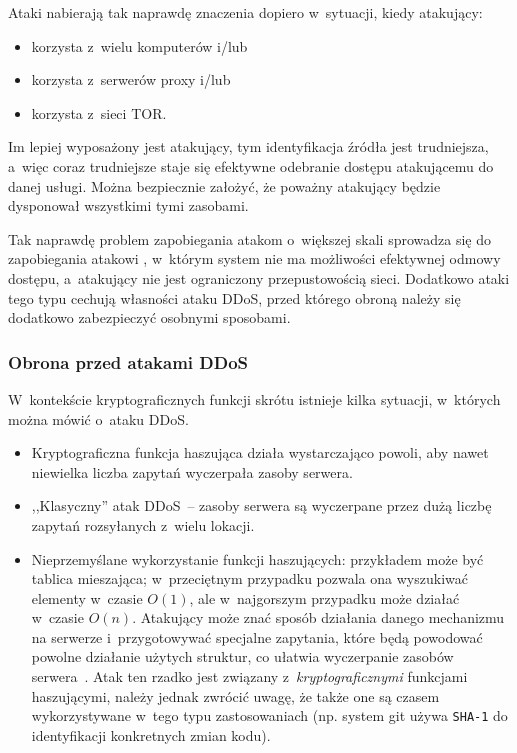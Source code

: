 Ataki  nabierają tak naprawdę znaczenia dopiero w~sytuacji, kiedy
atakujący:

\begin{itemize}

\item korzysta z~wielu komputerów i/lub
\item korzysta z~serwerów proxy i/lub
\item korzysta z~sieci TOR.

\end{itemize}

Im lepiej wyposażony jest atakujący, tym identyfikacja źródła jest trudniejsza,
a~więc coraz trudniejsze staje się efektywne odebranie dostępu atakującemu
do danej usługi. Można bezpiecznie założyć, że poważny atakujący będzie
dysponował wszystkimi tymi zasobami.

Tak naprawdę problem zapobiegania atakom o~większej skali sprowadza się do
zapobiegania atakowi , w~którym system nie ma możliwości efektywnej
odmowy dostępu, a~atakujący nie jest ograniczony przepustowością sieci.
Dodatkowo ataki tego typu cechują własności ataku DDoS, przed którego obroną
należy się dodatkowo zabezpieczyć osobnymi sposobami.

\subsubsection{Obrona przed atakami DDoS}
W~kontekście kryptograficznych funkcji skrótu istnieje kilka sytuacji,
w~których można mówić o~ataku DDoS.

\begin{itemize}

\item Kryptograficzna funkcja haszująca działa wystarczająco powoli, aby nawet
niewielka liczba zapytań wyczerpała zasoby serwera.

\item ,,Klasyczny'' atak DDoS~-- zasoby serwera są wyczerpane przez dużą liczbę
zapytań rozsyłanych z~wielu lokacji.

\item Nieprzemyślane wykorzystanie funkcji haszujących: przykładem może być
tablica mieszająca; w~przeciętnym przypadku pozwala ona wyszukiwać elementy
w~czasie $O(1)$, ale w~najgorszym przypadku może działać w~czasie $O(n)$.
Atakujący może znać sposób działania danego mechanizmu na serwerze
i~przygotowywać specjalne zapytania, które będą powodować powolne działanie
użytych struktur, co ułatwia wyczerpanie zasobów serwera~\cite{ddos_hashes}.
Atak ten rzadko jest związany z~\emph{kryptograficznymi} funkcjami haszującymi,
należy jednak zwrócić uwagę, że także one są czasem wykorzystywane w~tego typu
zastosowaniach (np. system git używa \texttt{SHA-1} do identyfikacji
konkretnych zmian kodu).

\end{itemize}

